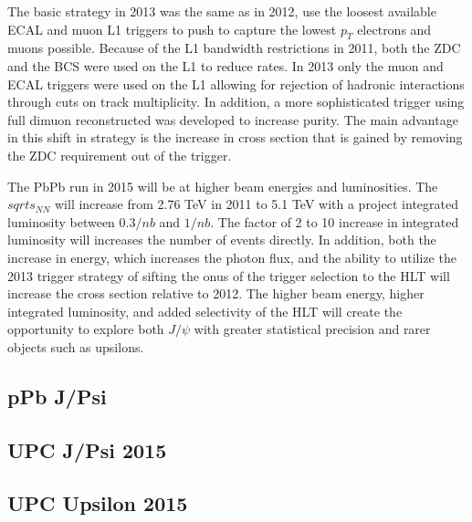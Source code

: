     The basic strategy in 2013 was the same as in 2012, use the loosest 
		  available ECAL and muon L1 triggers to push to capture the lowest $p_{T}$
			electrons and muons possible.
		Because of the L1 bandwidth restrictions in 2011, both the ZDC and the BCS 
		  were used on the L1 to reduce rates.
		In 2013 only the muon and ECAL triggers were used on the L1 allowing for 
		  rejection of hadronic interactions through cuts on track multiplicity. 
		In addition, a more sophisticated trigger using full dimuon reconstructed 
		  was developed to increase purity.
		The main advantage in this shift in strategy is the increase in cross 
		  section that is gained by removing the ZDC requirement out of the trigger.

		The PbPb run in 2015 will be at higher beam energies and luminosities.
		The $sqrt{s_{NN}}$ will increase from 2.76 TeV in 2011 to 5.1 TeV with
		  a project integrated luminosity between $0.3/nb$ and $1/nb$. 
    The factor of 2 to 10 increase in integrated luminosity will increases the 
		  number of events directly.
		In addition, both the increase in energy, which increases the photon flux,
		  and the ability to utilize the 2013 trigger strategy of sifting the 
			onus of the trigger selection to the HLT will increase the cross section
			relative to 2012.
		The higher beam energy, higher integrated luminosity, and added selectivity
		  of the HLT will create the opportunity to explore both $J/\psi$ with 
			greater statistical precision and rarer objects such as upsilons. 

    \subsection{pPb J/Psi}
    
    \subsection{UPC J/Psi 2015}
    \subsection{UPC Upsilon 2015}
